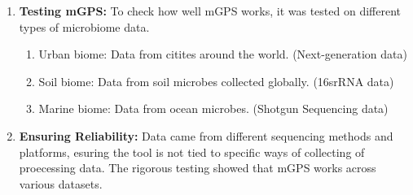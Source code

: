 \begin{enumerate}
\begin{enumerate}
    \end{enumerate}
    \item \textbf{Testing mGPS:} To check how well mGPS works, it was tested on different types of microbiome data.
    \begin{enumerate}
        \item Urban biome: Data from citites around the world. (Next-generation data)
        \item Soil biome: Data from soil microbes collected globally. (16srRNA data)
        \item Marine biome: Data from ocean microbes. (Shotgun Sequencing data)
    \end{enumerate}
    \item \textbf{Ensuring Reliability:} Data came from different sequencing methods and platforms, esuring the tool is not tied to specific ways of collecting of proecessing data.
    The rigorous testing showed that mGPS works across various datasets.
\end{enumerate}